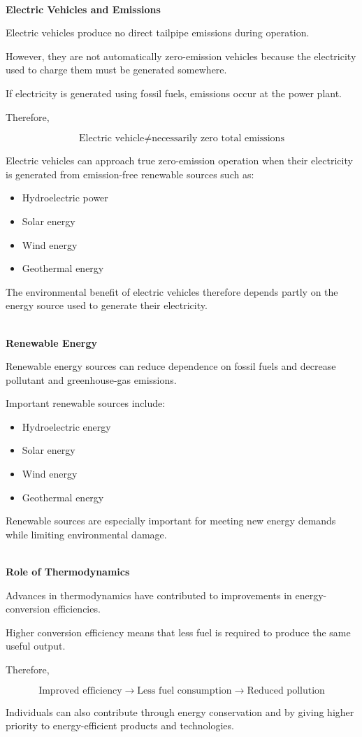 \documentclass[12pt]{article}
\begin{document}
\textbf{\\ Electric Vehicles and Emissions}

Electric vehicles produce no direct tailpipe emissions during operation.

However, they are not automatically zero-emission vehicles because the electricity used to charge them must be generated somewhere.

If electricity is generated using fossil fuels, emissions occur at the power plant.

Therefore,

\begin{equation*}
\text{Electric vehicle}
\neq
\text{necessarily zero total emissions}
\end{equation*}

Electric vehicles can approach true zero-emission operation when their electricity is generated from emission-free renewable sources such as:

\begin{itemize}
    \item Hydroelectric power
    \item Solar energy
    \item Wind energy
    \item Geothermal energy
\end{itemize}

The environmental benefit of electric vehicles therefore depends partly on the energy source used to generate their electricity.

\textbf{\\ Renewable Energy}

Renewable energy sources can reduce dependence on fossil fuels and decrease pollutant and greenhouse-gas emissions.

Important renewable sources include:

\begin{itemize}
    \item Hydroelectric energy
    \item Solar energy
    \item Wind energy
    \item Geothermal energy
\end{itemize}

Renewable sources are especially important for meeting new energy demands while limiting environmental damage.

\textbf{\\ Role of Thermodynamics}

Advances in thermodynamics have contributed to improvements in energy-conversion efficiencies.

Higher conversion efficiency means that less fuel is required to produce the same useful output.

Therefore,

\begin{equation*}
\text{Improved efficiency}
\longrightarrow
\text{Less fuel consumption}
\longrightarrow
\text{Reduced pollution}
\end{equation*}

Individuals can also contribute through energy conservation and by giving higher priority to energy-efficient products and technologies.
\end{document}
